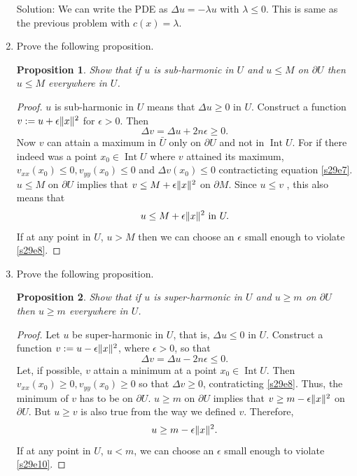 \documentclass{article}
\DeclarePairedDelimiter\norm{\lVert}{\rVert}
\DeclareMathOperator*{\Int}{Int}
\theoremstyle{plain}
\numberwithin{thm}{section}
\theoremstyle{plain}
\newtheorem{prop}{Proposition}
\numberwithin{prop}{section}
\theoremstyle{definition}
\numberwithin{defn}{section}
\theoremstyle{remark}
\numberwithin{equation}{section}
\begin{document}
\begin{enumerate}
Solution: We can write the PDE as $\Delta u = -\lambda u$ with $\lambda \le 0$. This is same as the previous 
problem with $c(x) = \lambda$. 

\item Prove the following proposition.
\begin{prop}\label{s29p1}
Show that if $u$ is sub-harmonic in $U$ and $u \le M$ on $\partial U$ then $u \le M$ everywhere in $U$.
\end{prop}
\begin{proof}
$u$ is sub-harmonic in $U$ means that $\Delta u \ge 0$ in $U$. Construct a function $v := u + 
\epsilon\norm{x}^2$ for $\epsilon > 0$. Then 
\begin{equation}\label{s29e7}
\Delta v = \Delta u + 2n\epsilon \ge 0.
\end{equation}
Now $v$ can attain a maximum in $\bar{U}$ only on $\partial U$ and not in $\Int U$. For if there indeed was a point 
$x_0 \in \Int U$ where $v$ attained its maximum, $v_{xx}(x_0) \le 0, v_{yy}(x_0) \le 0$ and $\Delta v(x_0) \le 0$ 
contracticting equation \eqref{s29e7}. $u \le M$ on $\partial U$ implies that $v \le M + \epsilon\norm{x}^2$ on 
$\partial M$. Since $u \le v$ , this also means that 
\begin{equation}\label{s29e8}
u \le M + \epsilon\norm{x}^2 \text{ in } U.
\end{equation}
If at any point in $U$, $u > M$ then we can choose an $\epsilon$ small enough to violate \eqref{s29e8}.
\end{proof}

\item Prove the following proposition.
\begin{prop}\label{s29p2}
Show that if $u$ is super-harmonic in $U$ and $u \ge m$ on $\partial U$ then $u \ge m$ everywhere in $U$.
\end{prop}
\begin{proof}
Let $u$ be super-harmonic in $U$, that is, $\Delta u \le 0$ in $U$. Construct a function $v := u - 
\epsilon\norm{x}^2$, where $\epsilon > 0$, so that 
\begin{equation}\label{s29e9}
\Delta v = \Delta u - 2n\epsilon \le 0.
\end{equation} 
Let, if possible, $v$ attain a minimum at a point $x_0 \in \Int U$. Then $v_{xx}(x_0) \ge 0, v_{yy}(x_0) \ge 0$ so 
that $\Delta v \ge 0$, contraticting \eqref{s29e8}. Thus, the minimum of $v$ has to be on $\partial U$. $u \ge m$
on $\partial U$ implies that $v \ge m - \epsilon\norm{x}^2$ on $\partial U$. But $u \ge v$ is also true from the 
way we defined $v$. Therefore, 
\begin{equation}\label{s29e10}
u \ge m - \epsilon\norm{x}^2.
\end{equation}
If at any point in $U$, $u < m$, we can choose an 
$\epsilon$ small enough to violate \eqref{s29e10}.
\end{proof}


\end{enumerate}
\end{document}
